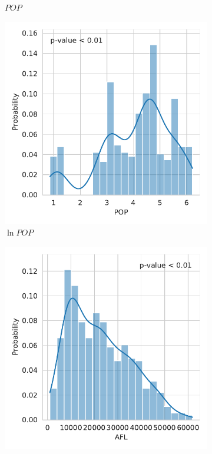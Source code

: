 \documentclass[12pt,a4paper]{article}
\begin{document}
\begin{figure}[htbp]
\begin{subfigure}{0.45\textwidth}
\caption{$POP$}
\end{subfigure}
\begin{subfigure}{0.45\textwidth}
\includegraphics[width=\textwidth]{./plots/dis/distplot_lnPOP.pdf}
\caption{$\ln POP$}
\end{subfigure}
\begin{subfigure}{0.45\textwidth}
\includegraphics[width=\textwidth]{./plots/dis/distplot_AFL.pdf}

\end{subfigure}
\end{figure}
\end{document}

